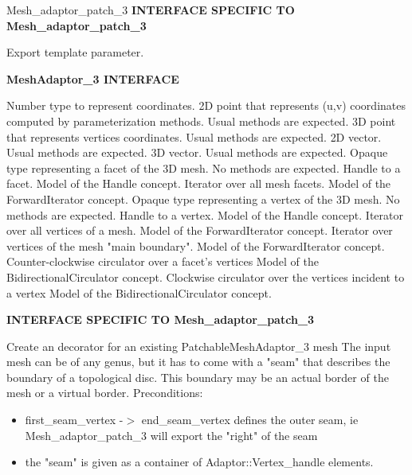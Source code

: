 \begin{ccRefClass}{Mesh_adaptor_patch_3}
{\bf INTERFACE SPECIFIC TO Mesh\_adaptor\_patch\_3}

{
Export template parameter.
}

{\bf MeshAdaptor\_3 INTERFACE}

{
Number type to represent coordinates.
}
{
2D point that represents (u,v) coordinates computed by parameterization methods. Usual methods are expected.
}
{
3D point that represents vertices coordinates. Usual methods are expected.
}
{
2D vector. Usual methods are expected.
}
{
3D vector. Usual methods are expected.
}
{
Opaque type representing a facet of the 3D mesh. No methods are expected.
}
{
Handle to a facet. Model of the Handle concept.
}
{
}
{
Iterator over all mesh facets. Model of the ForwardIterator concept.
}
{
}
{
Opaque type representing a vertex of the 3D mesh. No methods are expected.
}
{
Handle to a vertex. Model of the Handle concept.
}
{
}
{
Iterator over all vertices of a mesh. Model of the ForwardIterator concept.
}
{
}
{
Iterator over vertices of the mesh "main boundary". Model of the ForwardIterator concept.
}
{
}
{
Counter-clockwise circulator over a facet's vertices Model of the BidirectionalCirculator concept.
}
{
}
{
Clockwise circulator over the vertices incident to a vertex Model of the BidirectionalCirculator concept.
}
{
}


\ccCreation
{}  %

{\bf INTERFACE SPECIFIC TO Mesh\_adaptor\_patch\_3}

{
Create an decorator for an existing PatchableMeshAdaptor\_3 mesh The input mesh can be of any genus, but it has to come with a "seam" that describes the boundary of a topological disc. This boundary may be an actual border of the mesh or a virtual border.
Preconditions:\begin{itemize}
\item first\_seam\_vertex -$>$ end\_seam\_vertex defines the outer seam, ie Mesh\_adaptor\_patch\_3 will export the "right" of the seam\item the "seam" is given as a container of Adaptor::Vertex\_handle elements. \end{itemize}
}



\end{ccRefClass}
